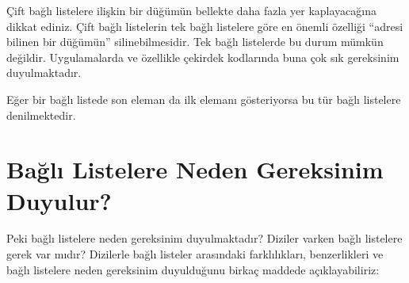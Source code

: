 \documentclass[a4paper,10pt,turkish]{sphinxmanual}
\begin{document}

\sphinxAtStartPar
Çift bağlı listelere ilişkin bir düğümün bellekte daha fazla yer kaplayacağına dikkat ediniz. Çift bağlı
listelerin tek bağlı listelere göre en önemli özelliği “adresi bilinen bir düğümün” silinebilmesidir.
Tek bağlı listelerde bu durum mümkün değildir. Uygulamalarda ve özellikle çekirdek kodlarında buna çok
sık gereksinim duyulmaktadır.

\sphinxAtStartPar
Eğer bir bağlı listede son eleman da ilk elemanı gösteriyorsa bu tür bağlı listelere  denilmektedir.


\section{Bağlı Listelere Neden Gereksinim Duyulur?}
\label{\detokenize{kernellinkedlistandhashtable:bagli-listelere-neden-gereksinim-duyulur}}
\sphinxAtStartPar
Peki bağlı listelere neden gereksinim duyulmaktadır? Diziler varken bağlı listelere gerek var mıdır?
Dizilerle bağlı listeler arasındaki farklılıkları, benzerlikleri ve bağlı listelere neden gereksinim
duyulduğunu birkaç maddede açıklayabiliriz:
\end{document}
